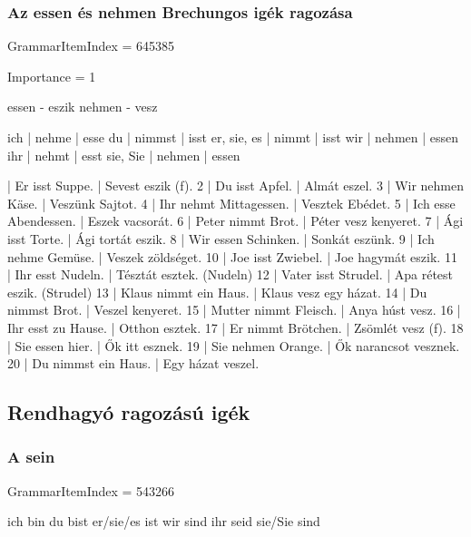 \documentclass{article}
\newenvironment{desc}{\verbatim}{\endverbatim}
\newenvironment{exmp}{\verbatim}{\endverbatim}
\begin{document}
\begin{exmp}
\end{exmp}

\subsubsection{Az essen és nehmen Brechungos igék ragozása}

GrammarItemIndex = 645385

Importance = 1

\begin{desc}
essen - eszik
nehmen - vesz

ich         | nehme  | esse 
du          | nimmst | isst 
er, sie, es | nimmt  | isst 
wir         | nehmen | essen 
ihr         | nehmt  | esst 
sie, Sie    | nehmen | essen 
\end{desc}

\begin{exmp}
1 | Er isst Suppe. | Sevest eszik (f).
2 | Du isst Apfel. | Almát eszel.
3 | Wir nehmen Käse. | Veszünk Sajtot.
4 | Ihr nehmt Mittagessen. | Vesztek Ebédet.
5 | Ich esse Abendessen. | Eszek vacsorát.
6 | Peter nimmt Brot. | Péter vesz kenyeret.
7 | Ági isst Torte. | Ági tortát eszik.
8 | Wir essen Schinken. | Sonkát eszünk.
9 | Ich nehme Gemüse. | Veszek zöldséget.
10 | Joe isst Zwiebel. | Joe hagymát eszik.
11 | Ihr esst Nudeln. | Tésztát esztek. (Nudeln)
12 | Vater isst Strudel. | Apa rétest eszik. (Strudel)
13 | Klaus nimmt ein Haus. | Klaus vesz egy házat.
14 | Du nimmst Brot. | Veszel kenyeret.
15 | Mutter nimmt Fleisch. | Anya húst vesz.
16 | Ihr esst zu Hause. | Otthon esztek.
17 | Er nimmt Brötchen. | Zsömlét vesz (f).
18 | Sie essen hier. | Ők itt esznek.
19 | Sie nehmen Orange. | Ők narancsot vesznek.
20 | Du nimmst ein Haus. | Egy házat veszel.
\end{exmp}

\subsection{Rendhagyó ragozású igék}

\subsubsection{A sein}

GrammarItemIndex = 543266

\begin{desc}
ich bin 
du bist 
er/sie/es ist 
wir sind 
ihr seid 
sie/Sie sind 
\end{desc}
\end{document}
